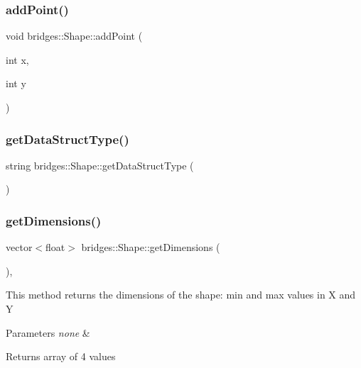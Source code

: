 \subsubsection{\texorpdfstring{add\+Point()}{addPoint()}}
{\footnotesize\ttfamily void bridges\+::\+Shape\+::add\+Point (\begin{DoxyParamCaption}\item[{int}]{x,  }\item[{int}]{y }\end{DoxyParamCaption})\hspace{0.3cm}{\ttfamily [inline]}}

\mbox{\label{classbridges_1_1_shape_ac1aa859856aad0bac2716f98e87028ba}} 
\subsubsection{\texorpdfstring{get\+Data\+Struct\+Type()}{getDataStructType()}}
{\footnotesize\ttfamily string bridges\+::\+Shape\+::get\+Data\+Struct\+Type (\begin{DoxyParamCaption}{ }\end{DoxyParamCaption})\hspace{0.3cm}{\ttfamily [inline]}}

\mbox{\label{classbridges_1_1_shape_a51efcce7a516ec5feeead962ad87e8b8}} 
\subsubsection{\texorpdfstring{get\+Dimensions()}{getDimensions()}}
{\footnotesize\ttfamily vector$<$float$>$ bridges\+::\+Shape\+::get\+Dimensions (\begin{DoxyParamCaption}{ }\end{DoxyParamCaption})\hspace{0.3cm}{\ttfamily [inline]}, {\ttfamily [virtual]}}

This method returns the dimensions of the shape\+: min and max values in X and Y


\begin{DoxyParams}{Parameters}
{\em none} & \\
\hline
\end{DoxyParams}
\begin{DoxyReturn}{Returns}
array of 4 values 
\end{DoxyReturn}


